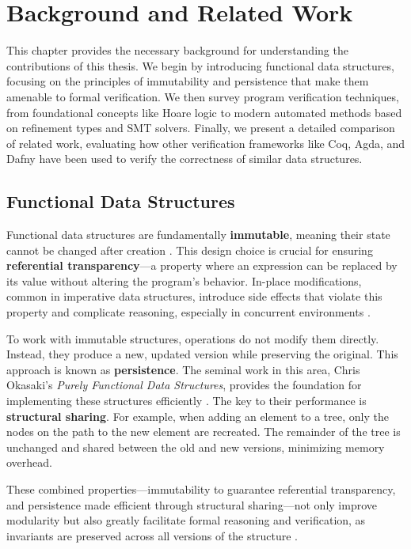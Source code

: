 
\chapter{Background and Related Work}
\label{chap:background}

This chapter provides the necessary background for understanding the contributions of this thesis. We begin by introducing functional data structures, focusing on the principles of immutability and persistence that make them amenable to formal verification. We then survey program verification techniques, from foundational concepts like Hoare logic to modern automated methods based on refinement types and SMT solvers. Finally, we present a detailed comparison of related work, evaluating how other verification frameworks like Coq, Agda, and Dafny have been used to verify the correctness of similar data structures.

\section{Functional Data Structures}

Functional data structures are fundamentally \textbf{immutable}, meaning their state cannot be changed after creation \cite{okasaki}.
This design choice is crucial for ensuring \textbf{referential transparency}---a property where an expression can be replaced by its value without altering the program's behavior.
In-place modifications, common in imperative data structures, introduce side effects that violate this property and complicate reasoning, especially in concurrent environments \cite{okasaki}.

To work with immutable structures, operations do not modify them directly.
Instead, they produce a new, updated version while preserving the original.
This approach is known as \textbf{persistence}.
The seminal work in this area, Chris Okasaki's \textit{Purely Functional Data Structures}, provides the foundation for implementing these structures efficiently \cite{okasaki}.
The key to their performance is \textbf{structural sharing}.
For example, when adding an element to a tree, only the nodes on the path to the new element are recreated.
The remainder of the tree is unchanged and shared between the old and new versions, minimizing memory overhead.

These combined properties—immutability to guarantee referential transparency, and persistence made efficient through structural sharing—not only improve modularity but also greatly facilitate formal reasoning and verification, as invariants are preserved across all versions of the structure \cite{okasaki}.

